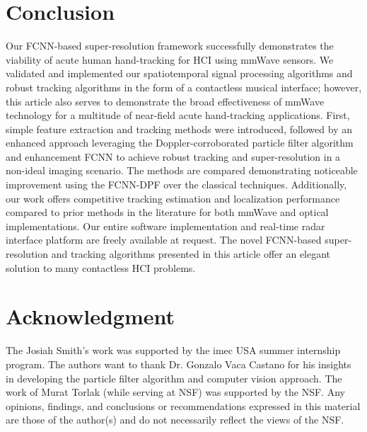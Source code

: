 \documentclass[10pt,journal,final]{IEEEtran}
\begin{document}
\section{Conclusion}
\label{sec:conclusion}

Our FCNN-based super-resolution framework successfully demonstrates the viability of acute human hand-tracking for HCI using mmWave sensors. 
We validated and implemented our spatiotemporal signal processing algorithms and robust tracking algorithms in the form of a contactless musical interface; however, this article also serves to demonstrate the broad effectiveness of mmWave technology for a multitude of near-field acute hand-tracking applications. 
First, simple feature extraction and tracking methods were introduced, followed by an enhanced approach leveraging the Doppler-corroborated particle filter algorithm and enhancement FCNN to achieve robust tracking and super-resolution in a non-ideal imaging scenario.
The methods are compared demonstrating noticeable improvement using the FCNN-DPF over the classical techniques.
Additionally, our work offers competitive tracking estimation and localization performance compared to prior methods in the literature for both mmWave and optical implementations. 
Our entire software implementation and real-time radar interface platform are freely available at request.
The novel FCNN-based super-resolution and tracking algorithms presented in this article offer an elegant solution to many contactless HCI problems.

\section*{Acknowledgment}
The Josiah Smith's work was supported by the imec USA summer internship program. The authors want to thank Dr. Gonzalo Vaca Castano for his insights in developing the particle filter algorithm and computer vision approach. The work of Murat Torlak (while serving at NSF) was supported by the NSF. Any opinions, findings, and conclusions or recommendations expressed in this material are those of the author(s) and do not necessarily reflect the views of the NSF.



\end{document}
